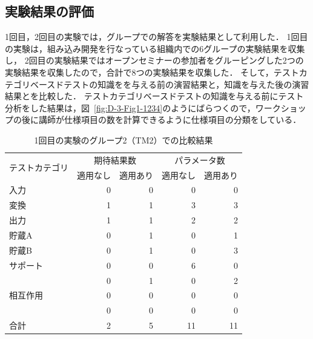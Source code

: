 \subsection{実験結果の評価}
1回目，2回目の実験では，グループでの解答を実験結果として利用した．
1回目の実験は，組み込み開発を行なっている組織内での6グループの実験結果を収集し，
2回目の実験結果ではオープンセミナーの参加者をグルーピングした2つの実験結果を収集したので，合計で8つの実験結果を収集した．
そして，テストカテゴリベースドテストの知識をを与える前の演習結果と，知識を与えた後の演習結果とを比較した．
テストカテゴリベースドテストの知識を与える前にテスト分析をした結果は，図~\ref{fig:D-3-Fig1-1234}のようにばらつくので，ワークショップの後に講師が仕様項目の数を計算できるように仕様項目の分類をしている．


\begin{table}[htbp]
  \centering
   \caption{1回目の実験のグループ2（TM2）での比較結果 }
    \begin{tabular}{|l|r|r|r|r|}
    \hline
    \multirow{2}[4]{*}{テストカテゴリ} & \multicolumn{2}{c|}{期待結果数} & \multicolumn{2}{c|}{パラメータ数} \bigstrut\\
\cline{2-5}          & \multicolumn{1}{l|}{適用なし} & \multicolumn{1}{l|}{適用あり} & \multicolumn{1}{l|}{適用なし} & \multicolumn{1}{l|}{適用あり} \bigstrut\\
    \hline
    \hline
    入力    & 0     & 0     & 0     & 0 \bigstrut\\
    \hline
    変換    & 1     & 1     & 3     & 3 \bigstrut\\
    \hline
    出力    & 1     & 1     & 2     & 2 \bigstrut\\
    \hline
    貯蔵A   & 0     & 1     & 0     & 1 \bigstrut\\
    \hline
    貯蔵B   & 0     & 1     & 0     & 3 \bigstrut\\
    \hline
    サポート  & 0     & 0     & 6     & 0 \bigstrut\\
    \hline
    \multirow{3}[6]{*}{相互作用} & 0     & 1     & 0     & 2 \bigstrut\\
\cline{2-5}          & 0     & 0     & 0     & 0 \bigstrut\\
\cline{2-5}          & 0     & 0     & 0     & 0 \bigstrut\\
    \hline
    合計    & 2     & 5     & 11    & 11 \bigstrut\\
    \hline
    \end{tabular}%
   \label{tab:D-3-tab3}%
\end{table}%


